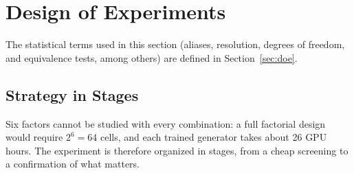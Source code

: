 \section{Design of Experiments}

The statistical terms used in this section (aliases, resolution, degrees of freedom, and equivalence tests, among others) are defined in Section~\ref{sec:doe}.

\subsection{Strategy in Stages}

Six factors cannot be studied with every combination: a full factorial design would require $2^6=64$ cells, and each trained generator takes about 26 GPU hours. The experiment is therefore organized in stages, from a cheap screening to a confirmation of what matters.

